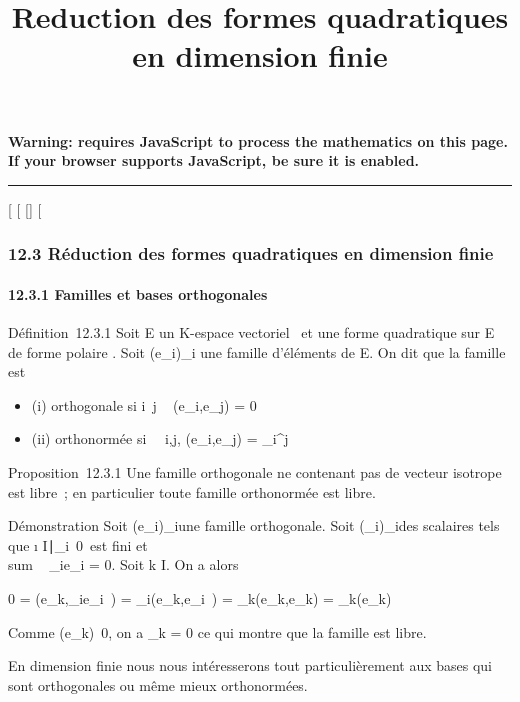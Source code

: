 \documentclass[]{article}
\title{Reduction des formes quadratiques en dimension finie}
\author{}
\date{}
\begin{document}
\maketitle

\textbf{Warning: 
requires JavaScript to process the mathematics on this page.\\ If your
browser supports JavaScript, be sure it is enabled.}

\begin{center}\rule{3in}{0.4pt}\end{center}

[
[
[]
[

\subsubsection{12.3 Réduction des formes quadratiques en dimension
finie}

\paragraph{12.3.1 Familles et bases orthogonales}

Définition~12.3.1 Soit E un K-espace vectoriel ~et \Phi une forme
quadratique sur E de forme polaire \phi. Soit (e_i)_i\inI
une famille d'éléments de E. On dit que la famille est

\begin{itemize}
\itemsep1pt\parskip0pt
\item
  (i) orthogonale si i\neq~j \rigtharrow~
  \phi(e_i,e_j) = 0
\item
  (ii) orthonormée si \forall~~i,j,
  \phi(e_i,e_j) = \delta_i^j
\end{itemize}

Proposition~12.3.1 Une famille orthogonale ne contenant pas de vecteur
isotrope est libre~; en particulier toute famille orthonormée est libre.

Démonstration Soit (e_i)_i\inI une famille orthogonale.
Soit (\lambda_i)_i\inI des scalaires tels que
\i \in
I∣\lambda_i\mathrel\neq~0\
est fini et \\sum ~
\lambda_ie_i = 0. Soit k \in I. On a alors

0 = \phi(e_k,\sum \lambda_ie_i~)
= \sum \lambda_i\phi(e_k,e_i~) =
\lambda_k\phi(e_k,e_k) = \lambda_k\Phi(e_k)

Comme \Phi(e_k)\neq~0, on a \lambda_k =
0 ce qui montre que la famille est libre.

En dimension finie nous nous intéresserons tout particulièrement aux
bases qui sont orthogonales ou même mieux orthonormées.
\end{document}
